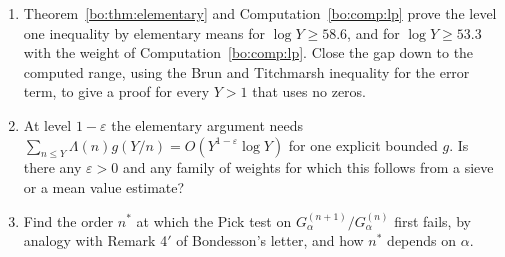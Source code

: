 \begin{enumerate}
\item Theorem~\ref{bo:thm:elementary} and Computation~\ref{bo:comp:lp} prove the level one inequality by elementary means for $\log Y\ge58.6$, and for $\log Y\ge53.3$ with the weight of Computation~\ref{bo:comp:lp}. Close the gap down to the computed range, using the Brun and Titchmarsh inequality for the error term, to give a proof for every $Y>1$ that uses no zeros.
\item At level $1-\varepsilon$ the elementary argument needs $\sum_{n\le Y}\Lambda(n)g(Y/n)=O(Y^{1-\varepsilon}\log Y)$ for one explicit bounded $g$. Is there any $\varepsilon>0$ and any family of weights for which this follows from a sieve or a mean value estimate?
\item Find the order $n^*$ at which the Pick test on $G_\alpha^{(n+1)}/G_\alpha^{(n)}$ first fails, by analogy with Remark 4$'$ of Bondesson's letter, and how $n^*$ depends on $\alpha$.
\end{enumerate}

